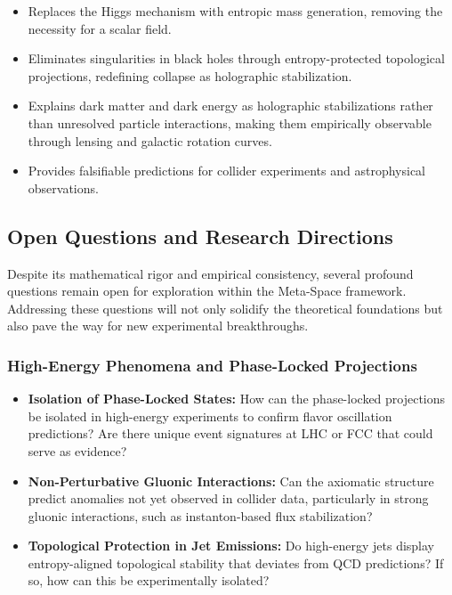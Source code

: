 \documentclass[10.5pt,a4paper]{article}
\begin{document}
\begin{itemize}
    \item Replaces the Higgs mechanism with entropic mass generation, removing the necessity for a scalar field.
    \item Eliminates singularities in black holes through entropy-protected topological projections, redefining collapse as holographic stabilization.
    \item Explains dark matter and dark energy as holographic stabilizations rather than unresolved particle interactions, making them empirically observable through lensing and galactic rotation curves.
    \item Provides falsifiable predictions for collider experiments and astrophysical observations.
\end{itemize}

\subsection{Open Questions and Research Directions}

Despite its mathematical rigor and empirical consistency, several profound questions remain open for exploration within the Meta-Space framework. Addressing these questions will not only solidify the theoretical foundations but also pave the way for new experimental breakthroughs.

\subsubsection{High-Energy Phenomena and Phase-Locked Projections}

\begin{itemize}
    \item \textbf{Isolation of Phase-Locked States:} How can the phase-locked projections be isolated in high-energy experiments to confirm flavor oscillation predictions? Are there unique event signatures at LHC or FCC that could serve as evidence?

    \item \textbf{Non-Perturbative Gluonic Interactions:} Can the axiomatic structure predict anomalies not yet observed in collider data, particularly in strong gluonic interactions, such as instanton-based flux stabilization?

    \item \textbf{Topological Protection in Jet Emissions:} Do high-energy jets display entropy-aligned topological stability that deviates from QCD predictions? If so, how can this be experimentally isolated?
\end{itemize}
\end{document}
